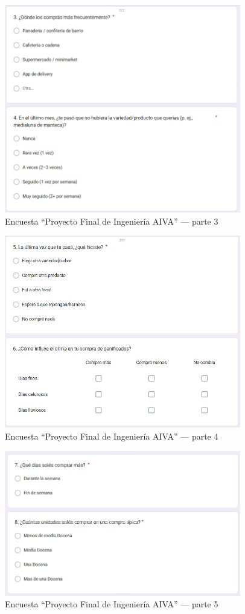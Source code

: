 \begin{figure}[htbp]
  \centering
  \includegraphics[width=0.92\textwidth]{images/encuesta_p3.png}
  \caption{Encuesta “Proyecto Final de Ingeniería AIVA” — parte 3}
  \label{fig:encuesta-aiva-3}
\end{figure}

\begin{figure}[htbp]
  \centering
  \includegraphics[width=0.92\textwidth]{images/encuesta_p4.png}
  \caption{Encuesta “Proyecto Final de Ingeniería AIVA” — parte 4}
  \label{fig:encuesta-aiva-4}
\end{figure}


\begin{figure}[htbp]
  \centering
  \includegraphics[width=0.92\textwidth]{images/encuesta_p5.png}
  \caption{Encuesta “Proyecto Final de Ingeniería AIVA” — parte 5}
  \label{fig:encuesta-aiva-5}
\end{figure}
\clearpage

